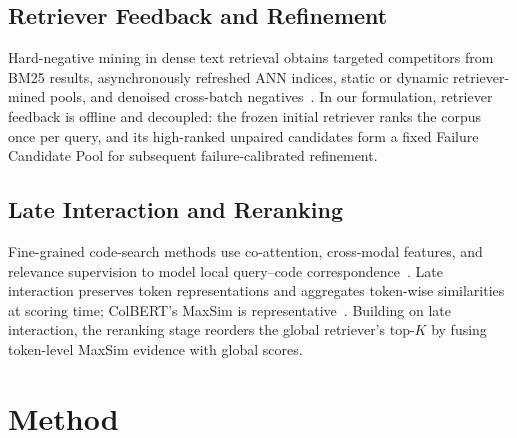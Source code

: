 \documentclass[11pt]{article}
\begin{document}
\subsection{Retriever Feedback and Refinement}

Hard-negative mining in dense text retrieval obtains targeted competitors from BM25 results, asynchronously refreshed ANN indices, static or dynamic retriever-mined pools, and denoised cross-batch negatives~\citep{DPR,ANCE,HardNegDR,RocketQA}. In our formulation, retriever feedback is offline and decoupled: the frozen initial retriever ranks the corpus once per query, and its high-ranked unpaired candidates form a fixed Failure Candidate Pool for subsequent failure-calibrated refinement.

\subsection{Late Interaction and Reranking}

Fine-grained code-search methods use co-attention, cross-modal features, and relevance supervision to model local query--code correspondence~\citep{FcarCS,FineGrainedCS,HedgeCode}. Late interaction preserves token representations and aggregates token-wise similarities at scoring time; ColBERT's MaxSim is representative~\citep{ColBERT}. Building on late interaction, the reranking stage reorders the global retriever's top-\(K\) by fusing token-level MaxSim evidence with global scores.

\section{Method}
\label{sec:method}
\end{document}
